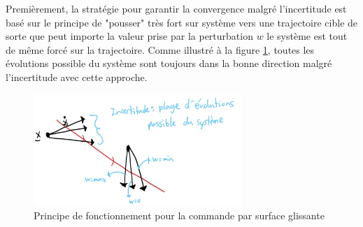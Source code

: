 
Premièrement, la stratégie pour garantir la convergence malgré l'incertitude est basé sur le principe de "pousser" très fort sur système vers une trajectoire cible de sorte que peut importe la valeur prise par la perturbation $w$ le système est tout de même forcé sur la trajectoire. Comme illustré à la figure \ref{fig:slidingmode3}, toutes les évolutions possible du système sont toujours dans la bonne direction malgré l'incertitude avec cette approche.
\begin{figure}[htp]
	\centering
		\includegraphics[width=0.70\textwidth]{fig/slidingmode3.jpeg}
	\caption{Principe de fonctionnement pour la commande par surface glissante}
	\label{fig:slidingmode3}
\end{figure}


